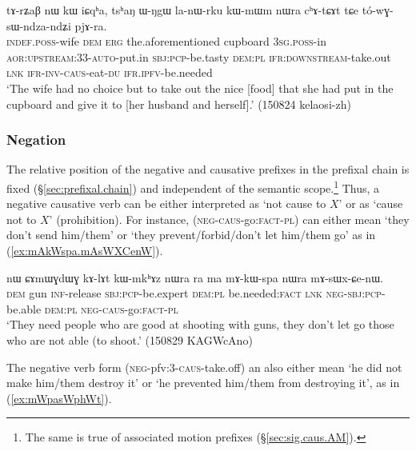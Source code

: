 \begin{exe}
\ex \label{ex:toWGsWndzandZi.pjAra}
\gll tɤ-rʑaβ nɯ kɯ iɕqʰa, tsʰaŋ ɯ-ŋgɯ la-nɯ-rku kɯ-mɯm nɯra cʰɤ-tɕɤt tɕe tó-wɣ-sɯ-ndza-ndʑi pjɤ-ra. \\
\textsc{indef}.\textsc{poss}-wife \textsc{dem} \textsc{erg} the.aforementioned cupboard \textsc{3sg}.\textsc{poss}-in \textsc{aor}:\textsc{upstream}:3\fl{}3-\textsc{auto}-put.in \textsc{sbj}:\textsc{pcp}-be.tasty \textsc{dem}:\textsc{pl} \textsc{ifr}:\textsc{downstream}-take.out \textsc{lnk} \textsc{ifr}-\textsc{inv}-\textsc{caus}-eat-\textsc{du} \textsc{ifr}.\textsc{ipfv}-be.needed \\
\glt `The wife had no choice but to take out the nice [food] that she had put in the cupboard and give it to [her husband and herself].' (150824 kelaosi-zh)
\end{exe}


\subsubsection{Negation} \label{sec:sig.caus.negation}
The relative position of the negative and causative prefixes in the prefixal chain is fixed (§\ref{sec:prefixal.chain}) and independent of the semantic scope.\footnote{The same is true of associated motion prefixes (§\ref{sec:sig.caus.AM}). } Thus, a negative causative verb can be either  interpreted as `not cause to $X$' or as `cause not to $X$' (prohibition).   For instance,  (\textsc{neg}-\textsc{caus}-go:\textsc{fact}-\textsc{pl}) can either mean `they don't send him/them' or `they prevent/forbid/don't let him/them go' as in (\ref{ex:mAkWspa.mAsWXCenW}).
 
\begin{exe}
\ex \label{ex:mAkWspa.mAsWXCenW}
\gll nɯ ɕɤmɯɣdɯɣ kɤ-lɤt kɯ-mkʰɤz nɯra ra ma mɤ-kɯ-spa nɯra mɤ-sɯx-ɕe-nɯ. \\
\textsc{dem} gun \textsc{inf}-release \textsc{sbj}:\textsc{pcp}-be.expert \textsc{dem}:\textsc{pl} be.needed:\textsc{fact} \textsc{lnk} \textsc{neg}-\textsc{sbj}:\textsc{pcp}-be.able \textsc{dem}:\textsc{pl} \textsc{neg}-\textsc{caus}-go:\textsc{fact}-\textsc{pl} \\
\glt `They need people who are good at shooting with guns, they don't let go those who are not able (to shoot.' (150829 KAGWcAno)
\end{exe}
 
The negative verb form  (\textsc{neg}-pfv:3\flobv{}-\textsc{caus}-take.off) an also either mean `he did not make him/them destroy it' or `he prevented him/them from destroying it', as in (\ref{ex:mWpasWphWt}).

